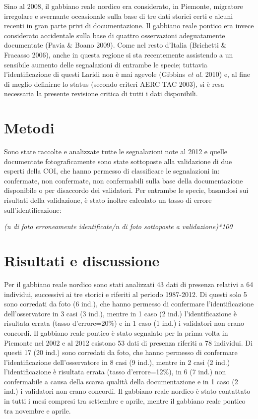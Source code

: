 Sino al 2008, il gabbiano reale nordico era considerato, in Piemonte,
migratore irregolare e svernante occasionale sulla base di tre dati
storici certi e alcuni recenti in gran parte privi di documentazione.
Il gabbiano reale pontico era invece considerato accidentale sulla base
di quattro osservazioni adeguatamente documentate (Pavia \& Boano
2009). Come nel resto d{\textquoteright}Italia (Brichetti \& Fracasso
2006), anche in questa regione si sta recentemente assistendo a un
sensibile aumento delle segnalazioni di entrambe le specie; tuttavia
l{\textquoteright}identificazione di questi Laridi non \`e mai agevole
(Gibbins \textit{et al.} 2010) e, al fine di meglio definirne lo status
(secondo criteri AERC TAC 2003), si \`e resa necessaria la presente
revisione critica di tutti i dati disponibili. 

\section*{Metodi}

Sono state raccolte e analizzate tutte le segnalazioni note al 2012 e
quelle documentate fotograficamente sono state sottoposte alla
validazione di due esperti della COI, che hanno permesso di
classificare le segnalazioni in: confermate, non confermate, non
confermabili sulla base della documentazione disponibile o per
disaccordo dei validatori. Per entrambe le specie, basandosi sui
risultati della validazione, \`e stato inoltre calcolato un tasso di
errore sull{\textquoteright}identificazione:

\begin{center}
\textit{
(n{\textdegree} di foto erroneamente
identificate/n{\textdegree} di foto sottoposte a validazione)*100}
\end{center}

\section*{Risultati e discussione}

Per il gabbiano reale nordico sono stati analizzati 43 dati di presenza relativi
a 64 individui, successivi ai tre storici e riferiti al periodo
1987-2012. Di questi solo 5 sono corredati da foto (6 ind.), che hanno
permesso di confermare l{\textquoteright}identificazione
dell{\textquoteright}osservatore in 3 casi (3 ind.), mentre in 1 caso
(2 ind.) l{\textquoteright}identificazione \`e risultata errata (tasso
d{\textquoteright}errore=20\%) e in 1 caso (1 ind.) i validatori non
erano concordi. Il gabbiano reale pontico \`e stato segnalato per la prima volta
in Piemonte nel 2002 e al 2012 esistono 53 dati di presenza riferiti a
78 individui. Di questi 17 (20 ind.) sono corredati da foto, che hanno
permesso di confermare l{\textquoteright}identificazione
dell{\textquoteright}osservatore in 8 casi (9 ind.), mentre in 2 casi
(2 ind.) l{\textquoteright}identificazione \`e risultata errata (tasso
d{\textquoteright}errore=12\%), in 6 (7 ind.) non confermabile a causa
della scarsa qualit\`a della documentazione e in 1 caso (2 ind.) i
validatori non erano concordi. Il gabbiano reale nordico \`e stato contattato in
tutti i mesi compresi tra settembre e aprile, mentre il gabbiano reale pontico
tra novembre e aprile.

